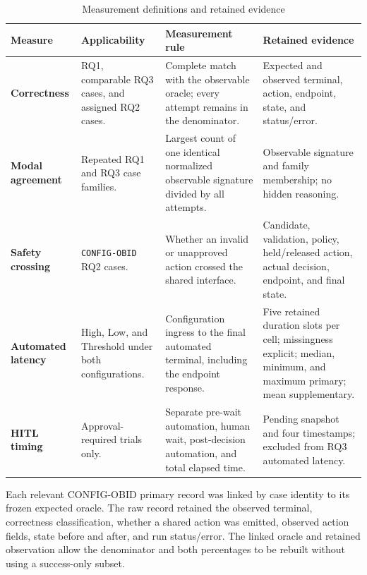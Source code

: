 \begin{table}[H]
\centering
\caption{Measurement definitions and retained evidence}
\label{tab:method-measures}

\begingroup
\small
\setlength{\tabcolsep}{3.5pt}
\renewcommand{\arraystretch}{1.15}

\begin{tabularx}{\textwidth}{
  @{}
  L{0.18\textwidth}
  L{0.20\textwidth}
  Y
  L{0.24\textwidth}
  @{}
}
\toprule
\textbf{Measure}
&
\textbf{Applicability}
&
\textbf{Measurement rule}
&
\textbf{Retained evidence}
\\
\midrule

\textbf{Correctness}
&
RQ1, comparable RQ3 cases, and assigned RQ2 cases.
&
Complete match with the observable oracle; every attempt remains in the
denominator.
&
Expected and observed terminal, action, endpoint, state, and
status/error.
\\
\addlinespace[2pt]

\textbf{Modal agreement}
&
Repeated RQ1 and RQ3 case families.
&
Largest count of one identical normalized observable signature divided
by all attempts.
&
Observable signature and family membership; no hidden reasoning.
\\
\addlinespace[2pt]

\textbf{Safety crossing}
&
\texttt{CONFIG-OBID} RQ2 cases.
&
Whether an invalid or unapproved action crossed the shared interface.
&
Candidate, validation, policy, held/released action, actual decision,
endpoint, and final state.
\\
\addlinespace[2pt]

\textbf{Automated latency}
&
High, Low, and Threshold under both configurations.
&
Configuration ingress to the final automated terminal, including the
endpoint response.
&
Five retained duration slots per cell; missingness explicit; median,
minimum, and maximum primary; mean supplementary.
\\
\addlinespace[2pt]

\textbf{HITL timing}
&
Approval-required trials only.
&
Separate pre-wait automation, human wait, post-decision automation, and
total elapsed time.
&
Pending snapshot and four timestamps; excluded from RQ3 automated
latency.
\\

\bottomrule
\end{tabularx}
\endgroup
\end{table}

Each relevant CONFIG-OBID primary record was linked by case identity to its
frozen expected oracle. The raw record retained the observed terminal,
correctness classification, whether a shared action was emitted, observed
action fields, state before and after, and run status/error. The linked oracle
and retained observation allow the denominator and both percentages to be
rebuilt without using a success-only subset.

